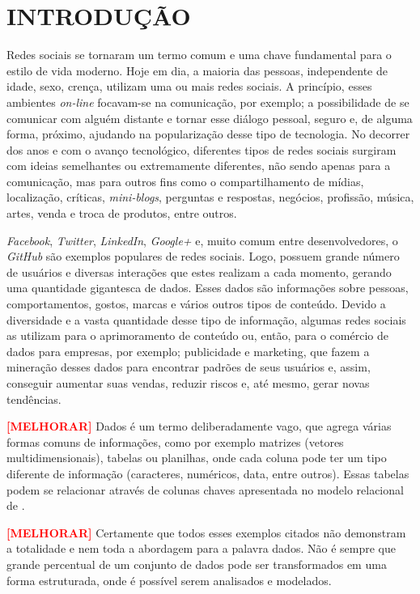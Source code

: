 \chapter{INTRODUÇÃO}\label{ch:introducao}

Redes sociais se tornaram um termo comum e uma chave fundamental para o estilo de vida moderno. Hoje em dia, a maioria das pessoas, independente de idade, sexo, crença, utilizam uma ou mais redes sociais. A princípio, esses ambientes \textit{on-line} focavam-se na comunicação, por exemplo; a possibilidade de se comunicar com alguém distante e tornar esse diálogo pessoal, seguro e, de alguma forma, próximo, ajudando na popularização desse tipo de tecnologia. No decorrer dos anos e com o avanço tecnológico, diferentes tipos de redes sociais surgiram com ideias semelhantes ou extremamente diferentes, não sendo apenas para a comunicação, mas para outros fins como o compartilhamento de mídias, localização, críticas, \textit{mini-blogs}, perguntas e respostas, negócios, profissão, música, artes, venda e troca de produtos, entre outros.

\textit{Facebook}, \textit{Twitter}, \textit{LinkedIn}, \textit{Google+} e, muito comum entre desenvolvedores, o \textit{GitHub} são exemplos populares de redes sociais. Logo, possuem grande número de usuários e diversas interações que estes realizam a cada momento, gerando uma quantidade gigantesca de dados. Esses dados são informações sobre pessoas, comportamentos, gostos, marcas e vários outros tipos de conteúdo. Devido a diversidade e a vasta quantidade desse tipo de informação, algumas redes sociais as utilizam para o aprimoramento de conteúdo ou, então, para o comércio de dados para empresas, por exemplo; publicidade e marketing, que fazem a mineração desses dados para encontrar padrões de seus usuários e, assim, conseguir aumentar suas vendas, reduzir riscos e, até mesmo, gerar novas tendências.

\textbf{\textcolor{red}{[MELHORAR]}} Dados é um termo deliberadamente vago, que agrega várias formas comuns de informações, como por exemplo matrizes (vetores multidimensionais), tabelas ou planilhas, onde cada coluna pode ter um tipo diferente de informação (caracteres, numéricos, data, entre outros). Essas tabelas podem se relacionar através de colunas chaves apresentada no modelo relacional de .

\textbf{\textcolor{red}{[MELHORAR]}} Certamente que todos esses exemplos citados não demonstram a totalidade e nem toda a abordagem para a palavra dados. Não é sempre que grande percentual de um conjunto de dados pode ser transformados em uma forma estruturada, onde é possível serem analisados e modelados.

